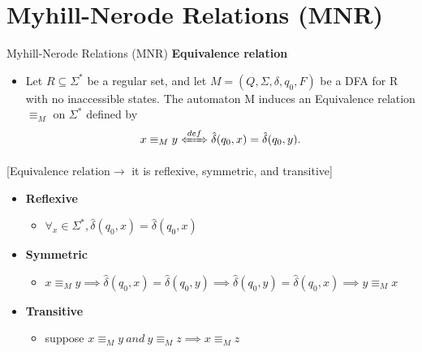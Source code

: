 \documentclass{beamer}
\begin{document}
\section{Myhill-Nerode Relations (MNR)}
\begin{frame}{Myhill-Nerode Relations (MNR)}
\textbf{Equivalence relation}
\begin{itemize}
	\item Let $R \subseteq \Sigma^*$ be a regular set, and let $M = (Q, \Sigma, \delta, q_0, F)$ be a DFA  for 
	R with no inaccessible  states. The automaton M induces an Equivalence 
	relation $\equiv_M$ on $\Sigma^*$ defined by
	$$x \equiv_M y \xLeftrightarrow{def} \hat{\delta}(q_0,x) = \hat{\delta}(q_0,y). $$
\end{itemize}
[Equivalence  relation$\rightarrow$ it is reflexive, symmetric, and transitive]
\begin{itemize}
	\item \textbf{Reflexive}
	\begin{itemize}
		\item $\forall_x \in\Sigma^*,\hat{\delta}(q_0,x)=\hat{\delta}(q_0,x)$
	\end{itemize}
\item \textbf{Symmetric}
\begin{itemize}
	\item $x\equiv_M y \implies \hat{\delta}(q_0,x)=\hat{\delta}(q_0,y)\implies\hat{\delta}(q_0,y)=\hat{\delta}(q_0,x) \implies y\equiv_M x$
\end{itemize}
\item \textbf{Transitive}
\begin{itemize}
	\item suppose $x \equiv_M y \ and \ y \equiv_M z \implies x\equiv_M z$
\end{itemize}
\end{itemize}
\end{frame}
\end{document}
